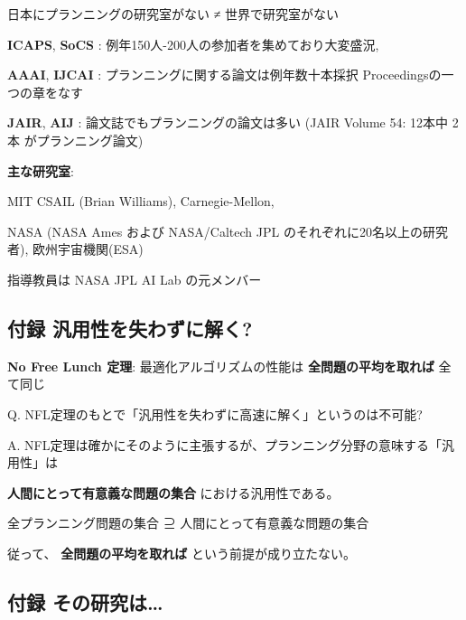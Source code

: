 日本にプランニングの研究室がない ≠ 世界で研究室がない

\textbf{ICAPS}, \textbf{SoCS} : 例年150人-200人の参加者を集めており大変盛況, 

\textbf{AAAI}, \textbf{IJCAI} : プランニングに関する論文は例年数十本採択 Proceedingsの一つの章をなす

\textbf{JAIR}, \textbf{AIJ} : 論文誌でもプランニングの論文は多い (JAIR Volume 54: 12本中 2本 がプランニング論文)

\textbf{主な研究室}:

MIT CSAIL (Brian Williams), Carnegie-Mellon, 

NASA (NASA Ames および NASA/Caltech JPL のそれぞれに20名以上の研究者), 欧州宇宙機関(ESA)

指導教員は NASA JPL AI Lab の元メンバー

\subsection{付録 汎用性を失わずに解く?}
\label{sec-5-14}

\textbf{No Free Lunch 定理}: 最適化アルゴリズムの性能は \textbf{全問題の平均を取れば} 全て同じ

Q. NFL定理のもとで「汎用性を失わずに高速に解く」というのは不可能?

A. NFL定理は確かにそのように主張するが、プランニング分野の意味する「汎用性」は

\textbf{人間にとって有意義な問題の集合} における汎用性である。

\begin{center}
全プランニング問題の集合 ⊇ 人間にとって有意義な問題の集合
\end{center}

従って、 \textbf{全問題の平均を取れば} という前提が成り立たない。

\subsection{付録 その研究は\ldots{}}
\label{sec-5-15}



